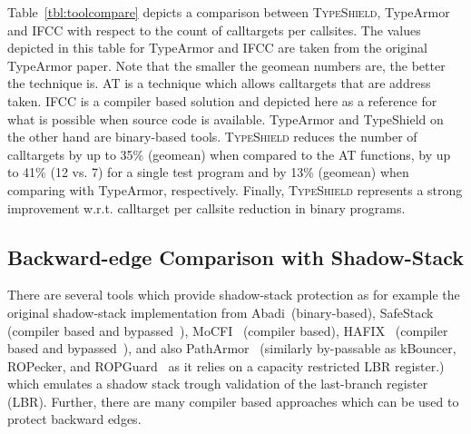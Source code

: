Table~\ref{tbl:toolcompare} depicts 
a comparison between \textsc{TypeShield}, TypeArmor and IFCC with respect to the count of calltargets per callsites. 
The values depicted in this table for TypeArmor and IFCC are taken from the original TypeArmor paper.
Note that the smaller the geomean numbers are, the better the technique is. AT is a technique which allows calltargets that are address taken. 
IFCC is a compiler based solution and depicted here as a reference for what is possible when 
source code is available. TypeArmor and TypeShield on the other hand are binary-based tools. 
\textsc{TypeShield} reduces the number of calltargets by up to 35\% (geomean) when 
compared to the AT functions, by up to 41\% (12 vs. 7) for a single test program and by 13\% (geomean) 
when comparing with TypeArmor, respectively.
Finally, \textsc{TypeShield} represents a strong improvement w.r.t. calltarget per callsite reduction in binary programs.

\subsection{Backward-edge Comparison with Shadow-Stack}
\label{RQ10: Comparison with SafeStack}
There are several tools which provide shadow-stack protection as for example 
the original shadow-stack implementation from Abadi~\cite{abadi:cfi2}(binary-based), SafeStack~\cite{volodymyr:cpi} (compiler based and bypassed~\cite{safestack:bypassing}), 
MoCFI~\cite{mcfi:niu} (compiler based), HAFIX~\cite{hafix} (compiler based and bypassed~\cite{hafix:bypass}), and 
also PathArmor~\cite{veen:cfi} (similarly by-passable as kBouncer, ROPecker, and ROPGuard~\cite{schuster:raid} as it relies on a capacity restricted LBR register.)
which emulates a shadow stack trough validation of the last-branch register (LBR).
Further, there are many compiler based approaches which can be used to protect backward edges. 

